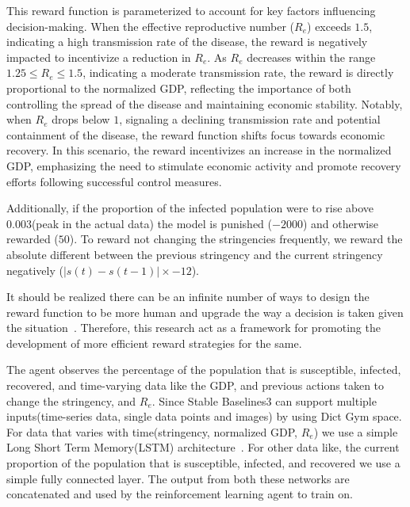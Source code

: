 \documentclass[tikz,fleqn,12pt]{wlscirep}
\begin{document}
This reward function is parameterized to account for key factors influencing decision-making. When the effective reproductive number ($R_e$) exceeds $1.5$, indicating a high transmission rate of the disease, the reward is negatively impacted to incentivize a reduction in $R_e$. As $R_e$ decreases within the range $1.25 \leq R_e \leq 1.5$, indicating a moderate transmission rate, the reward is directly proportional to the normalized GDP, reflecting the importance of both controlling the spread of the disease and maintaining economic stability. Notably, when $R_e$ drops below $1$, signaling a declining transmission rate and potential containment of the disease, the reward function shifts focus towards economic recovery. In this scenario, the reward incentivizes an increase in the normalized GDP, emphasizing the need to stimulate economic activity and promote recovery efforts following successful control measures.

Additionally, if the proportion of the infected population were to rise above 0.003(peak in the actual data) the model is punished ($-2000$) and otherwise rewarded ($50$). To reward not changing the stringencies frequently, we reward the absolute different between the previous stringency and the current stringency negatively ($|s(t) - s(t-1)| \times -12$).

It should be realized there can be an infinite number of ways to design the reward function to be more human and upgrade the way a decision is taken given the situation~\cite{AWSDeepRacer}. Therefore, this research act as a  framework for promoting the development of more efficient reward strategies for the same. 

The agent observes the percentage of the population that is susceptible, infected, recovered, and time-varying data like the GDP, and previous actions taken to change the stringency, and $R_e$. Since Stable Baselines3 can support multiple inputs(time-series data, single data points and images) by using Dict Gym space. For data that varies with time(stringency, normalized GDP, $R_e$) we use a simple Long Short Term Memory(LSTM) architecture~\cite{LSTM}. For other data like, the current proportion of the population that is susceptible, infected, and recovered we use a simple fully connected layer. The output from both these networks are concatenated and used by the reinforcement learning agent to train on.
\end{document}
